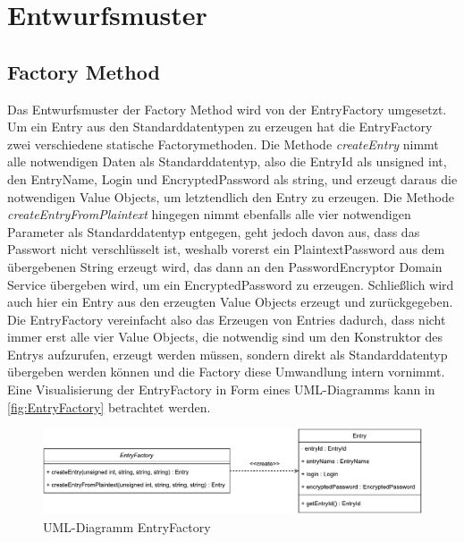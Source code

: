 \chapter{Entwurfsmuster}
\section{Factory Method}
Das Entwurfsmuster der Factory Method wird von der EntryFactory umgesetzt. Um ein Entry aus den Standarddatentypen zu erzeugen hat die EntryFactory zwei verschiedene statische Factorymethoden. Die Methode \textit{createEntry} nimmt alle notwendigen Daten als Standarddatentyp, also die EntryId als unsigned int, den EntryName, Login und EncryptedPassword als string, und erzeugt daraus die notwendigen Value Objects, um letztendlich den Entry zu erzeugen. Die Methode \textit{createEntryFromPlaintext} hingegen nimmt ebenfalls alle vier notwendigen Parameter als Standarddatentyp entgegen, geht jedoch davon aus, dass das Passwort nicht verschlüsselt ist, weshalb vorerst ein PlaintextPassword aus dem übergebenen String erzeugt wird, das dann an den PasswordEncryptor Domain Service übergeben wird, um ein EncryptedPassword zu erzeugen. Schließlich wird auch hier ein Entry aus den erzeugten Value Objects erzeugt und zurückgegeben. Die EntryFactory vereinfacht also das Erzeugen von Entries dadurch, dass nicht immer erst alle vier Value Objects, die notwendig sind um den Konstruktor des Entrys aufzurufen, erzeugt werden müssen, sondern direkt als Standarddatentyp übergeben werden können und die Factory diese Umwandlung intern vornimmt. Eine Visualisierung der EntryFactory in Form eines UML-Diagramms kann in \autoref{fig:EntryFactory} betrachtet werden.\\

\begin{figure}[ht]
	\centering
	\includegraphics[width=1.0\textwidth]{Bilder/EntryFactory.pdf}
	\caption{UML-Diagramm EntryFactory}
	\label{fig:EntryFactory}
\end{figure}
